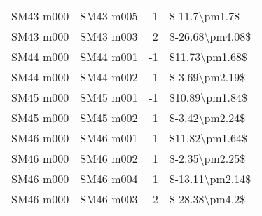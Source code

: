 \begin{longtable}{llrl}
 SM43 m000 &     SM43 m005 &       1 &    \$-11.7\textbackslash pm1.7\$ \\
 SM43 m000 &     SM43 m003 &       2 &  \$-26.68\textbackslash pm4.08\$ \\
 SM44 m000 &     SM44 m001 &      -1 &   \$11.73\textbackslash pm1.68\$ \\
 SM44 m000 &     SM44 m002 &       1 &   \$-3.69\textbackslash pm2.19\$ \\
 SM45 m000 &     SM45 m001 &      -1 &   \$10.89\textbackslash pm1.84\$ \\
 SM45 m000 &     SM45 m002 &       1 &   \$-3.42\textbackslash pm2.24\$ \\
 SM46 m000 &     SM46 m001 &      -1 &   \$11.82\textbackslash pm1.64\$ \\
 SM46 m000 &     SM46 m002 &       1 &   \$-2.35\textbackslash pm2.25\$ \\
 SM46 m000 &     SM46 m004 &       1 &  \$-13.11\textbackslash pm2.14\$ \\
 SM46 m000 &     SM46 m003 &       2 &   \$-28.38\textbackslash pm4.2\$ \\
\end{longtable}
